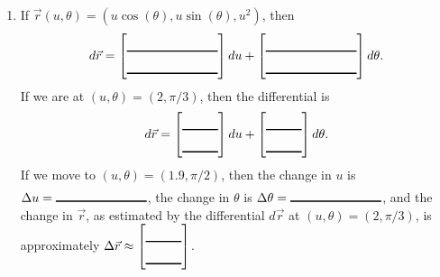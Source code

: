 \begin{problem}
\begin{enumerate}
\item If $\vec r(u,\theta)=(u\cos(\theta), u\sin(\theta), u^2)$, then 
$$d\vec r = \begin{bmatrix}\blank{1in}\\\blank{1in}\end{bmatrix}du +  \begin{bmatrix}\blank{1in}\\\blank{1in}\end{bmatrix}d\theta.$$
If we are at $(u,\theta)=(2,\pi/3)$, then the differential is $$d\vec r = \begin{bmatrix}\blank{1cm}\\\blank{1cm}\end{bmatrix}du +  \begin{bmatrix}\blank{1cm}\\\blank{1cm}\end{bmatrix}d\theta.$$
If we move to $(u,\theta)=(1.9, \pi/2)$, then the change in $u$ is $\Delta u=\blank{1in}$, the change in $\theta$ is $\Delta \theta=\blank{1in}$, and the change in $\vec r$, as estimated by the differential $d\vec r$ at $(u,\theta)=(2,\pi/3)$, is approximately $\Delta \vec r\approx \begin{bmatrix}\blank{1cm}\\\blank{1cm}\end{bmatrix}$.
  \end{enumerate}

\end{problem}

